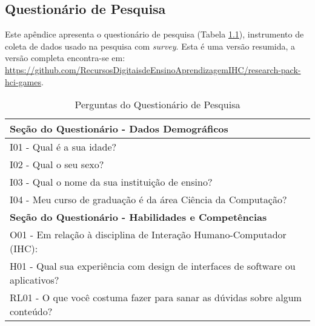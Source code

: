 \begin{apendicesenv}


\chapter{Questionário de Pesquisa}
\label{ap:questionario}

Este apêndice apresenta o questionário de pesquisa (Tabela \ref{tab:quest-survey}), instrumento de coleta de dados usado na pesquisa com \textit{survey}. Esta é uma versão resumida, a versão completa encontra-se em: \url{https://github.com/RecursosDigitaisdeEnsinoAprendizagemIHC/research-pack-hci-games}.

\begin{table} [!h]
\centering
\caption{Perguntas do Questionário de Pesquisa}
\label{tab:quest-survey}
\begin{tabular}{|p{15.45cm}|}
\hline

\textbf{Seção do Questionário - Dados Demográficos} \\ \hline

I01 - Qual é a sua idade? \\ \hline

I02 - Qual o seu sexo? \\ \hline

I03 - Qual o nome da sua instituição de ensino? \\ \hline

I04 - Meu curso de graduação é da área Ciência da Computação? \\ \hline

\textbf{Seção do Questionário - Habilidades e Competências} \\ \hline

O01 - Em relação à disciplina de Interação Humano-Computador (IHC):\\ \hline

H01 - Qual sua experiência com design de interfaces de software ou aplicativos?
\\ \hline



RL01 - O que você costuma fazer para sanar as dúvidas sobre algum conteúdo?
\\ \hline


\end{tabular}
\end{table}
\end{apendicesenv}

